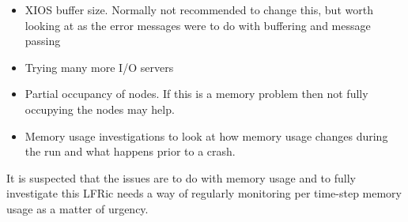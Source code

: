 \begin{itemize}
  \item XIOS buffer size. Normally not recommended to change this, but worth looking at as the error messages were to do with buffering and message passing
  \item Trying many more I/O servers
  \item Partial occupancy of nodes. If this is a memory problem then not fully occupying the nodes may help.
  \item Memory usage investigations to look at how memory usage changes during the run and what happens prior to a crash.
\end{itemize}


It is suspected that the issues are to do with memory usage and to
fully investigate this LFRic needs a way of regularly monitoring
per time-step memory usage as a matter of urgency.
 


